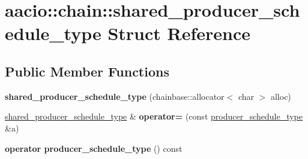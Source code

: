 \hypertarget{structaacio_1_1chain_1_1shared__producer__schedule__type}{}\section{aacio\+:\+:chain\+:\+:shared\+\_\+producer\+\_\+schedule\+\_\+type Struct Reference}
\label{structaacio_1_1chain_1_1shared__producer__schedule__type}
\subsection*{Public Member Functions}
\begin{DoxyCompactItemize}
\item 
\mbox{\label{structaacio_1_1chain_1_1shared__producer__schedule__type_a793bf667299f3234c87e6eaa65c072b2}} 
{\bfseries shared\+\_\+producer\+\_\+schedule\+\_\+type} (chainbase\+::allocator$<$ char $>$ alloc)
\item 
\mbox{\label{structaacio_1_1chain_1_1shared__producer__schedule__type_ad2f8497448d5ab20c6d73f6ea23ed6d2}} 
\mbox{\hyperlink{structaacio_1_1chain_1_1shared__producer__schedule__type}{shared\+\_\+producer\+\_\+schedule\+\_\+type}} \& {\bfseries operator=} (const \mbox{\hyperlink{structaacio_1_1chain_1_1producer__schedule__type}{producer\+\_\+schedule\+\_\+type}} \&a)
\item 
\mbox{\label{structaacio_1_1chain_1_1shared__producer__schedule__type_a5f8df1b688cde20ed59003f57ee46ae9}} 
{\bfseries operator producer\+\_\+schedule\+\_\+type} () const
\end{DoxyCompactItemize}
